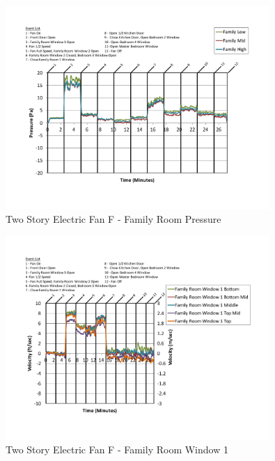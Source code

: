 \documentclass{article}
\begin{document}
\begin{appendices}
	\begin{figure}[H]
		\centering
		\includegraphics[height=3.05in,trim=0.67in 1.1in 0.67in 0.8in,clip=true]{0_Images/Results_Charts/ColdFlow/Two_Story/Electric/F/Family_Room_Pressure.pdf}
		\caption{Two Story Electric Fan F - Family Room Pressure}
	\end{figure}
 

	\begin{figure}[H]
		\centering
		\includegraphics[height=3.05in,trim=0.67in 1.1in 0.67in 0.8in,clip=true]{0_Images/Results_Charts/ColdFlow/Two_Story/Electric/F/Family_Room_Window_1.pdf}
		\caption{Two Story Electric Fan F - Family Room Window 1}
	\end{figure}
 
	\clearpage


\end{appendices}
\end{document}
